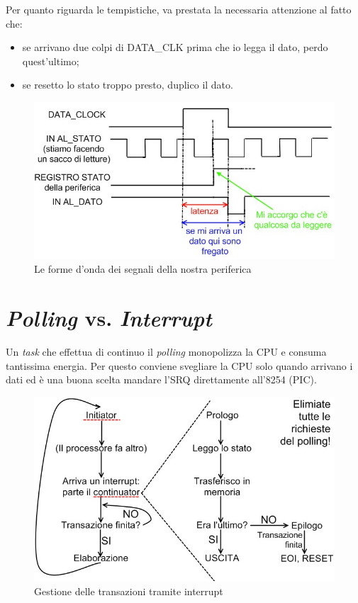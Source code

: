 Per quanto riguarda le tempistiche, va prestata la necessaria attenzione al fatto che:
\begin{itemize}
\item se arrivano due colpi di DATA\_CLK prima che io legga il dato, perdo quest'ultimo;
\item se resetto lo stato troppo presto, duplico il dato.
\end{itemize}

\begin{figure}[!h]
\centering
\includegraphics[width=0.75\columnwidth]{img/formeOndaPeriferiche}
\caption{Le forme d'onda dei segnali della nostra periferica}
\label{fig:formeOndaPeriferiche}
\end{figure}

\section{\textit{Polling} vs. \textit{Interrupt}}
\label{sec:pollingCriminale}

Un \textit{task} che effettua di continuo il \textit{polling} monopolizza la CPU e consuma tantissima energia. Per questo conviene svegliare la CPU solo quando arrivano i dati ed è una buona scelta mandare l'SRQ direttamente all'8254 (PIC).

\begin{figure}[!h]
\centering
\includegraphics[width=0.75\columnwidth]{img/interrupt}
\caption{Gestione delle transazioni tramite interrupt}
\label{fig:interrupt}
\end{figure}

